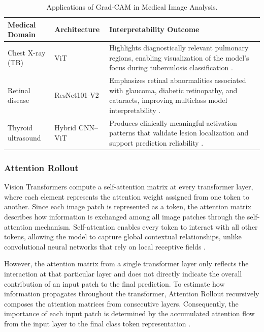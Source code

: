 \begin{table}[htbp]
    \caption{Applications of Grad-CAM in Medical Image Analysis.}
    \label{tab:medical_gradcam_comparison}
    \centering
    \setlength{\tabcolsep}{4pt}
    \begin{tabularx}{\columnwidth}{@{}>{\raggedright\arraybackslash}p{2.6cm} >{\raggedright\arraybackslash}p{2cm} >{\raggedright\arraybackslash}X@{}}
        \toprule
        \textbf{Medical Domain} & \textbf{Architecture} & \textbf{Interpretability Outcome} \\
        \midrule
        Chest X-ray (TB) &
        ViT &
        Highlights diagnostically relevant pulmonary regions, enabling visualization of the model's focus during tuberculosis classification \cite{Vanitha2025}.\\
        \addlinespace

        Retinal disease &
        ResNet101-V2 &
        Emphasizes retinal abnormalities associated with glaucoma, diabetic retinopathy, and cataracts, improving multiclass model interpretability \cite{AbdEl-Ghany2025}.\\
        \addlinespace

        Thyroid ultrasound &
        Hybrid CNN--ViT &
        Produces clinically meaningful activation patterns that validate lesion localization and support prediction reliability \cite{Alhafdhi2026}.\\
        \bottomrule
    \end{tabularx}
\end{table}

\subsubsection{Attention Rollout}

Vision Transformers compute a self-attention matrix at every transformer layer, where each element represents the attention weight assigned from one token to another.
Since each image patch is represented as a token, the attention matrix describes how information is exchanged among all image patches through the self-attention mechanism.
Self-attention enables every token to interact with all other tokens, allowing the model to capture global contextual relationships, unlike convolutional neural networks that rely on local receptive fields \cite{dosovitskiy2021imageworth16x16words}.

However, the attention matrix from a single transformer layer only reflects the interaction at that particular layer and does not directly indicate the overall contribution of an input patch to the final prediction.
To estimate how information propagates throughout the transformer, Attention Rollout recursively composes the attention matrices from consecutive layers.
Consequently, the importance of each input patch is determined by the accumulated attention flow from the input layer to the final class token representation \cite{Abnar2020}.

